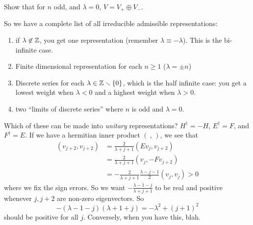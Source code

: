  \begin{exercise}
   Show that for $n$ odd, and $\lambda=0$, $V=V_+\oplus V_-$.
 \end{exercise}
 So we have a complete list of all irreducible admissible representations:
 \begin{enumerate}
   \item if $\lambda\not\in \mathbb{Z}$, you get one representation (remember $\lambda\equiv
   -\lambda$). This is the bi-infinite case.

   \item Finite dimensional representation for each $n\ge 1$ ($\lambda=\pm n$)

   \item Discrete series for each $\lambda\in \mathbb{Z}\smallsetminus \{0\}$, which is the
   half infinite case: you get a lowest weight when $\lambda< 0$ and a highest weight
   when $\lambda>0$.

   \item two ``limits of discrete series'' where $n$ is odd and $\lambda=0$.
 \end{enumerate}
 Which of these can be made into \emph{unitary} representations? $H^\dag = -H$,
 $E^\dag =F$, and $F^\dag = E$. If we have a hermitian inner product $(\ ,\,)$, we see
 that
 \begin{align*}
 (v_{j+2},v_{j+2}) &= \frac{2}{\lambda + j+1} (Ev_j,v_{j+2})\\
            &= \frac{2}{\lambda + j+1}(v_j,-Fv_{j+2}) \\
            &= - \frac{2}{\lambda + j+1} \frac{\overline{\lambda - j-1}}{2} (v_j,v_j)
            >0
 \end{align*}
 where we fix the sign errors. So we want $-\frac{\overline{\lambda-1-j}}{\lambda+j+1}$
 to be real and positive whenever $j,j+2$ are non-zero eigenvectors. So
 \[
    -(\lambda-1-j)(\lambda+1+j) = -\lambda^2 + (j+1)^2
 \]
 should be positive for all $j$. Conversely, when you have this, blah.


